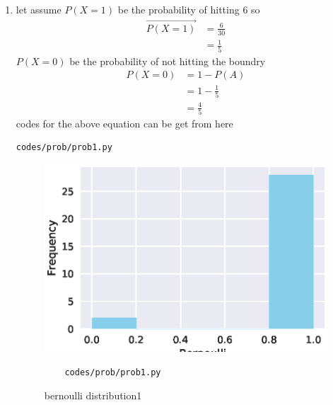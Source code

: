 \renewcommand{\theequation}{\theenumi}
\begin{enumerate}[label=\arabic*.,ref=\thesubsection.\theenumi]
\item let assume $P\left(X=1\right)$ be the probability of hitting 6 so
\begin{align}
\vec {P\left(X=1\right)} &= \frac{6}{30}
\\
&= \frac{1}{5}
\end{align}
$P\left(X=0\right)$ be the probability of not hitting the boundry
\begin{align}
P\left(X=0\right) &= 1 - P\left(A\right)
\\
&= 1-\frac{1}{5}
\\
&= \frac{4}{5}
\end{align}
codes for the above equation can be get from here
\begin{lstlisting}
codes/prob/prob1.py
\end{lstlisting}
\begin{figure}[!ht]
	\centering
	\includegraphics[width=\columnwidth]{./figures/prob/prob1.eps}
	\caption{bernoulli distribution1 }
	\label{fig:bt1}
	\begin{lstlisting}
	codes/prob/prob1.py
	\end{lstlisting}
\end{figure}
\end{enumerate}